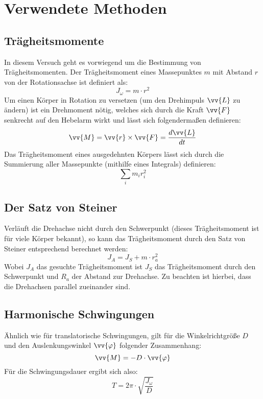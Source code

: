 \section{Verwendete Methoden}
\subsection{Trägheitsmomente}
In diesem Versuch geht es vorwiegend um die Bestimmung von Trägheitsmomenten. Der Trägheitsmoment eines Massepunktes $m$ mit Abstand $r$ von der Rotationsachse ist definiert als:
\begin{equation}
J_{\omega} = m \cdot r^2
\end{equation}
Um einen Körper in Rotation zu versetzen (um den Drehimpuls $\vv{L}$ zu ändern) ist ein Drehmoment nötig, welches sich durch die Kraft $\vv{F}$ senkrecht auf den Hebelarm wirkt und lässt sich folgendermaßen definieren:
\begin{equation}
\vv{M} = \vv{r} \times \vv{F} = \frac{d\vv{L}}{dt}
\end{equation}
Das Trägheitsmoment eines ausgedehnten Körpers lässt sich durch die Summierung aller Massepunkte (mithilfe eines Integrals) definieren:
\begin{equation}
\sum_i m_i r_i^2
\label{eq:traeg}
\end{equation}
\subsection{Der Satz von Steiner}
Verläuft die Drehachse nicht durch den Schwerpunkt (dieses Trägheitsmoment ist für viele Körper bekannt), so kann das Trägheitsmoment durch den Satz von Steiner entsprechend berechnet werden:
\begin{equation}
J_A = J_S + m \cdot r_a^2
\end{equation}
Wobei $J_A$ das gesuchte Trägheitsmoment ist $J_S$ das Trägheitsmoment durch den Schwerpunkt und $R_a$ der Abstand zur Drehachse. Zu beachten ist hierbei, dass die Drehachsen parallel zueinander sind.

\subsection{Harmonische Schwingungen}
Ähnlich wie für translatorische Schwingungen, gilt für die Winkelrichtgröße $D$ und den Auslenkungswinkel $\vv{\varphi}$ folgender Zusammenhang:
\begin{equation*}
\vv{M} = -D \cdot \vv{\varphi}
\end{equation*}
Für die Schwingungsdauer ergibt sich also:
\begin{equation}
T = 2\pi \cdot \sqrt{\frac{J_{\omega}}{D}}
\label{eq:wink}
\end{equation}

